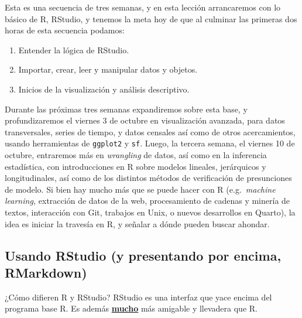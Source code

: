 \documentclass[
]{article}
\begin{document}
Esta es una secuencia de tres semanas, y en esta lección arrancaremos
con lo básico de R, RStudio, y tenemos la meta hoy de que al culminar
las primeras dos horas de esta secuencia podamos:

\begin{enumerate}
\def\labelenumi{\arabic{enumi}.}
\item
  Entender la lógica de RStudio.
\item
  Importar, crear, leer y manipular datos y objetos.
\item
  Inicios de la visualización y análisis descriptivo.
\end{enumerate}

Durante las próximas tres semanas expandiremos sobre esta base, y
profundizaremos el viernes 3 de octubre en visualización avanzada, para
datos transversales, series de tiempo, y datos censales así como de
otros acercamientos, usando herramientas de \texttt{ggplot2} y
\texttt{sf}. Luego, la tercera semana, el viernes 10 de octubre,
entraremos más en \emph{wrangling} de datos, así como en la inferencia
estadística, con introducciones en R sobre modelos lineales, jerárquicos
y longitudinales, así como de los distintos métodos de verificación de
presunciones de modelo. Si bien hay mucho más que se puede hacer con R
(e.g.~\emph{machine learning,} extracción de datos de la web,
procesamiento de cadenas y minería de textos, interacción con Git,
trabajos en Unix, o nuevos desarrollos en Quarto), la idea es iniciar la
travesía en R, y señalar a dónde pueden buscar ahondar.

\subsection{Usando RStudio (y presentando por encima,
RMarkdown)}\label{usando-rstudio-y-presentando-por-encima-rmarkdown}

¿Cómo difieren R y RStudio? RStudio es una interfaz que yace encima del
programa base R. Es además \ul{\textbf{mucho}} más amigable y llevadera
que R.
\end{document}
